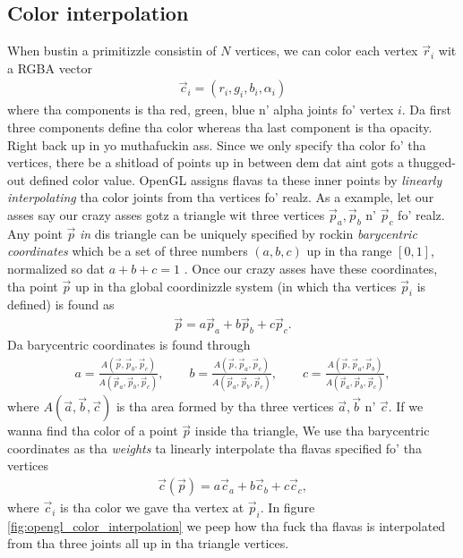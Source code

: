\subsection{Color interpolation}
\label{sec:opengl_color_interpolation}
When bustin a primitizzle consistin of $N$ vertices, we can color each vertex $\vec r_i$ wit a RGBA vector
\begin{align}
	\vec c_i = (r_i, g_i, b_i, \alpha_i)
\end{align}
where tha components is tha red, green, blue n' alpha joints fo' vertex $i$. Da first three components define tha color whereas tha last component is tha opacity. Right back up in yo muthafuckin ass. Since we only specify tha color fo' tha vertices, there be a shitload of points up in between dem dat aint gots a thugged-out defined color value. OpenGL assigns flavas ta these inner points by \textit{linearly interpolating} tha color joints from tha vertices fo' realz. As a example, let our asses say our crazy asses gotz a triangle wit three vertices $\vec p_a, \vec p_b$ n' $\vec p_c$ fo' realz. Any point $\vec p$ \textit{in} dis triangle can be uniquely specified by rockin \textit{barycentric coordinates} which be a set of three numbers $(a,b,c)$ up in tha range $[0,1]$, normalized so dat $a+b+c=1$ \cite{misc:opengl_es_specification}. Once our crazy asses have these coordinates, tha point $\vec p$ up in tha global coordinizzle system (in which tha vertices $\vec p_i$ is defined) is found as
\begin{align}
	\vec p = a\vec p_a + b\vec p_b + c\vec p_c.
\end{align}
Da barycentric coordinates is found through
\begin{align}
	a = \frac{A(\vec p, \vec p_b, \vec p_c)}{A(\vec p_a, \vec p_b, \vec p_c)}, \qquad b = \frac{A(\vec p, \vec p_a, \vec p_c)}{A(\vec p_a, \vec p_b, \vec p_c)}, \qquad c = \frac{A(\vec p, \vec p_a, \vec p_b)}{A(\vec p_a, \vec p_b, \vec p_c)},
\end{align}
where $A(\vec a, \vec b, \vec c)$ is tha area formed by tha three vertices $\vec a, \vec b$ n' $\vec c$. If we wanna find tha color of a point $\vec p$ inside tha triangle, We use tha barycentric coordinates as tha \textit{weights} ta linearly interpolate tha flavas specified fo' tha vertices
\begin{align}
	\vec c(\vec p) = a\vec c_a + b\vec c_b + c\vec c_c,
\end{align}
where $\vec c_i$ is tha color we gave tha vertex at $\vec p_i$. In figure \ref{fig:opengl_color_interpolation} we peep how tha fuck tha flavas is interpolated from tha three joints all up in tha triangle vertices.
